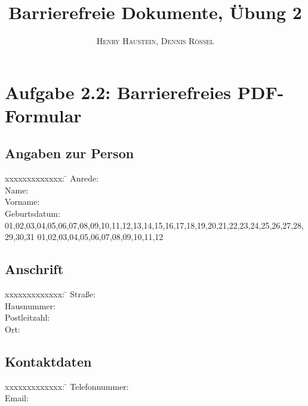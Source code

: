 \documentclass{article}
\title{\textbf{Barrierefreie Dokumente, Übung 2}}
\author{\textsc{Henry Haustein}, \textsc{Dennis Rössel}}
\date{}
\begin{document}
	\maketitle
	
	\section*{Aufgabe 2.2: Barrierefreies PDF-Formular}
	\begin{Form}[encoding=html]
		\subsection*{Angaben zur Person}
		\begin{tabbing}
			xxxxxxxxxxxxx: \= \kill  %
			Anrede:    \>
			 \\
			Name:           \> \TextField[name=name,width=3cm]
			{\mbox{}} \\
			Vorname:           \> \TextField[name=vor,width=3cm]
			{\mbox{}} \\
			
			Geburtsdatum:           \>
			\ChoiceMenu[combo,name=day,width=1cm,default=01]{\mbox{}}
			{01,02,03,04,05,06,07,08,09,10,11,12,13,14,15,16,17,18,19,20,21,22,23,24,25,26,27,28,29,30,31}
			\ChoiceMenu[combo,name=month,width=1cm,default=01]{\mbox{}}
			{01,02,03,04,05,06,07,08,09,10,11,12}
			 \TextField[name=year,width=3cm]{\mbox{}}
		\end{tabbing}
		\subsection*{Anschrift}
		\begin{tabbing}
			xxxxxxxxxxxxx: \= \kill  %
			Straße:           \> \TextField[name=street,width=3cm]{\mbox{}} \\
			Hausnummer:           \> \TextField[name=number,width=3cm]{\mbox{}} \\
			Postleitzahl:           \>\TextField[name=plz,width=3cm]{\mbox{}} \\
			Ort:           \>\TextField[name=ort,width=3cm]{\mbox{}}
		\end{tabbing}
		\subsection*{Kontaktdaten}
		\begin{tabbing}
			xxxxxxxxxxxxx: \= \kill  %
			Telefonnummer:           \> \TextField[name=telefon,width=3cm]{\mbox{}} \\
			Email:           \> \TextField[name=email,width=3cm]{\mbox{}}
		\end{tabbing}

\end{Form}
\end{document}
